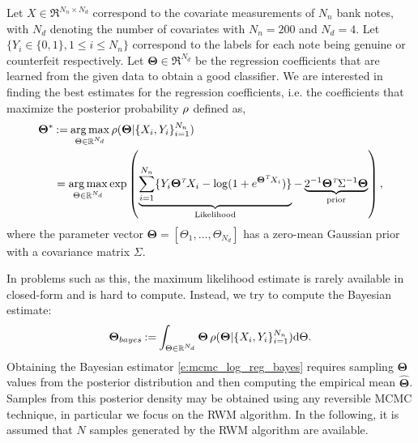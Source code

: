 Let $X \in \Re^{N_n \times N_d}$ correspond to the covariate measurements of $N_n$ bank notes, with $N_d$ denoting the number of covariates with $N_n = 200$ and $N_d = 4$. Let $\{Y_i  \in \{0,1\}, 1 \leq i \leq N_n \}$ correspond to the labels for each note being genuine or counterfeit respectively. Let $\boldsymbol{\Theta} \in \Re^{N_d}$ be the regression coefficients that are learned from the given data to obtain a good classifier. We are interested in finding the best estimates for the regression coefficients, i.e. the coefficients that maximize the posterior probability $\rho$ defined as,
\begin{equation}
\begin{aligned}
\boldsymbol{\Theta}^* &\eqdef  \argmax_{\Theta \in \Re^{N_d}} \pr(\boldsymbol{\Theta}| \{X_i,Y_i\}_{i=1}^{N_n}) \\
&= \argmax_{\Theta \in \Re^{N_d} }\exp\left( \underbrace{\sum_{i=1}^{N_n} \{Y_i \boldsymbol{\Theta}^\transpose X_i - \log(1+e^{\boldsymbol{\Theta}^\transpose X_i} ) \}}_{\text{Likelihood}} - \underbrace{2^{-1} \boldsymbol{\Theta}^\transpose \Sigma^{-1} \boldsymbol{\Theta}}_{\text{prior}} \right),
\end{aligned}
\label{e:mcmc_log_reg}
\end{equation}
where the parameter vector $\boldsymbol{\Theta} = [ \Theta_1, \dots ,\Theta_{N_d}]$ has a zero-mean Gaussian prior with a covariance matrix $\Sigma$.

In problems such as this, the maximum likelihood estimate is rarely available in closed-form and is hard to compute. Instead, we try to compute the Bayesian estimate: 
\begin{equation}
\boldsymbol{\Theta}_{{bayes}} \eqdef \int_{\Theta \in \Re^{N_d}} \boldsymbol{\Theta} \, \pr(\boldsymbol{\Theta}| \{X_i,Y_i\}_{i=1}^{N_n}) \ud \Theta.
\label{e:mcmc_log_reg_bayes}
\end{equation}
Obtaining the Bayesian estimator \eqref{e:mcmc_log_reg_bayes} requires sampling $\boldsymbol{\Theta}$ values from the posterior distribution and then computing the empirical mean $\hat{\boldsymbol{\Theta}}$. Samples from this posterior density may be obtained using any reversible MCMC technique, in particular we focus on the RWM algorithm. In the following, it is assumed that $N$ samples generated by the RWM algorithm are available.

